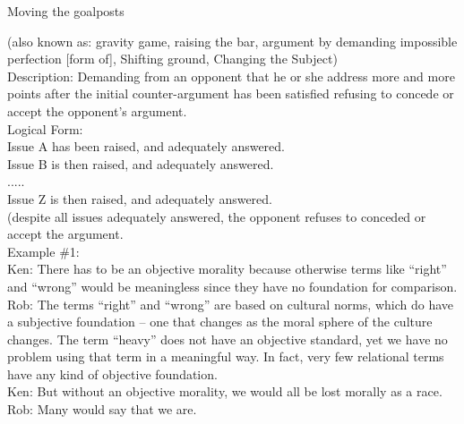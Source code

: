 \documentclass[a4paper,12pt,single,pdftex]{scrartcl}
\begin{document}
  

Moving the goalposts
    
      (also known as: gravity game, raising the bar, argument by demanding impossible perfection [form of], Shifting ground, Changing the Subject)
    \\

  
    
      Description: Demanding from an opponent that he or she address more and more points after the initial counter-argument has been satisfied refusing to concede or accept the opponent’s argument.
    \\

    
      Logical Form:
    \\

    
      Issue A has been raised, and adequately answered.
    \\

    
      Issue B is then raised, and adequately answered.
    \\

    
      .....
    \\

    
      Issue Z is then raised, and adequately answered.
    \\

    
      (despite all issues adequately answered, the opponent refuses to conceded or accept the argument.
    \\

    
      Example \#1:
    \\

    
      Ken: There has to be an objective morality because otherwise terms like “right” and “wrong” would be meaningless since they have no foundation for comparison. 
    \\

    
      Rob: The terms “right” and “wrong” are based on cultural norms, which do have a subjective foundation -- one that changes as the moral sphere of the culture changes.  The term “heavy” does not have an objective standard, yet we have no problem using that term in a meaningful way.  In fact, very few relational terms have any kind of objective foundation.
    \\

    
      Ken: But without an objective morality, we would all be lost morally as a race.
    \\

    
      Rob: Many would say that we are.
    \\
\end{document}
